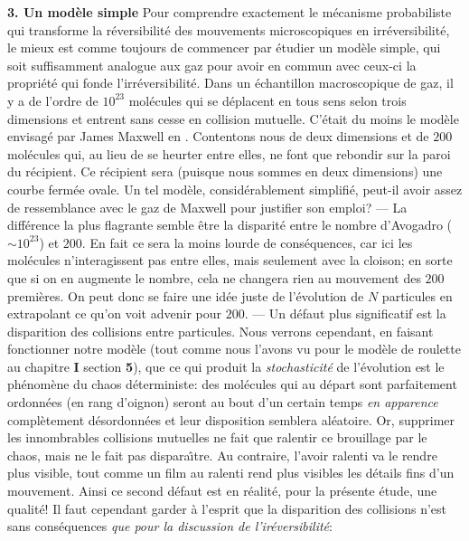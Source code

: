 { \bf 3. Un mod\`ele simple}
\medskip
Pour comprendre exactement le m\'ecanisme probabiliste qui transforme la
r\'eversibilit\'e des mouvements microscopiques en irr\'eversibilit\'e, le 
mieux est comme toujours de commencer par \'etudier un mod\`ele simple, 
qui soit suffisamment analogue aux gaz pour avoir en commun avec ceux-ci 
la propri\'et\'e qui fonde l'irr\'eversibilit\'e. Dans un \'echantillon
macroscopique de gaz, il y a de l'ordre de $10^{23}$ mol\'ecules qui se
d\'eplacent en tous sens selon trois dimensions et entrent sans cesse en
collision mutuelle. C'\'etait du moins le mod\`ele envisag\'e par James 
Maxwell en {}. Contentons nous de deux dimensions et de 
$200$ mol\'ecules qui, au lieu de se heurter entre elles, ne font que 
rebondir sur la paroi du r\'ecipient. Ce r\'ecipient sera (puisque nous 
sommes en deux dimensions) une courbe ferm\'ee ovale. 
\medskip
Un tel mod\`ele, consid\'erablement simplifi\'e, peut-il avoir assez de 
ressemblance avec le gaz de Maxwell pour justifier son emploi? 
\medskip
--- La diff\'erence la plus flagrante semble \^etre la disparit\'e entre le 
nombre d'Avogadro ($\sim 10^{23}$) et $200$. En fait ce sera la moins lourde 
de cons\'equences, car ici les mol\'ecules n'interagissent pas entre elles, 
mais seulement avec la cloison; en sorte que si on en augmente le nombre, 
cela ne changera rien au mouvement des $200$ premi\`eres. On peut donc se
faire une id\'ee juste de l'\'evolution de $N$ particules en extrapolant 
ce qu'on voit advenir pour $200$. 
\medskip
--- Un d\'efaut plus significatif est la disparition des collisions 
entre particules. Nous verrons cependant, en faisant fonctionner notre 
mod\`ele (tout comme nous l'avons vu pour le mod\`ele de roulette au 
chapitre {\bf I} section {\bf 5}), que ce qui produit la 
{\it stochasticit\'e} de l'\'evolution est le ph\'enom\`ene 
du chaos d\'eterministe: des mol\'ecules qui au d\'epart 
sont parfaitement ordonn\'ees (en rang d'oignon) seront au bout d'un 
certain temps {\it en apparence} compl\`etement d\'esordonn\'ees et leur 
disposition semblera al\'eatoire. Or, supprimer les innombrables 
collisions mutuelles ne fait que ralentir ce brouillage par le chaos, 
mais ne le fait pas dispara{\^\i}tre. Au contraire, l'avoir 
ralenti va le rendre plus visible, tout comme un film au ralenti 
rend plus visibles les d\'etails fins d'un mouvement. 
\medskip
Ainsi ce second d\'efaut est en r\'ealit\'e, pour la pr\'esente \'etude, 
une qualit\'e! Il faut cependant garder \`a l'esprit que la disparition 
des collisions n'est
sans cons\'equences {\it que pour la discussion de  l'ir\'eversibilit\'e}: 
